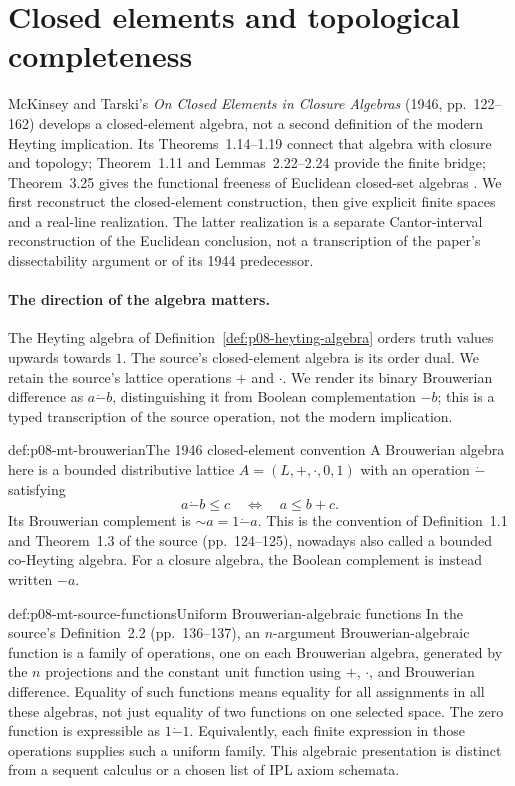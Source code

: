 \section{Closed elements and topological completeness}
\label{sec:p08-mt-topological-completeness}

McKinsey and Tarski's \emph{On Closed Elements in Closure Algebras}
(1946, pp.~122--162) develops a closed-element algebra, not a second
definition of the modern Heyting implication. Its Theorems~1.14--1.19
connect that algebra with closure and topology; Theorem~1.11 and
Lemmas~2.22--2.24 provide the finite bridge; Theorem~3.25 gives the
functional freeness of Euclidean closed-set algebras
\cite{McKinseyTarski1946}. We first reconstruct the closed-element
construction, then give explicit finite spaces and a real-line realization.
The latter realization is a separate Cantor-interval reconstruction of the
Euclidean conclusion, not a transcription of the paper's dissectability
argument or of its 1944 predecessor.

\paragraph{The direction of the algebra matters.}
The Heyting algebra of Definition~\ref{def:p08-heyting-algebra} orders truth
values upwards towards \(1\). The source's closed-element algebra is its
order dual. We retain the source's lattice operations \(+\) and \(\cdot\).
We render its binary Brouwerian difference as \(a\mathbin{\dot{-}}b\),
distinguishing it from Boolean complementation \(-b\); this is a typed
transcription of the source operation, not the modern implication.

\begin{hbdefinition}{def:p08-mt-brouwerian}{The 1946 closed-element convention}
A Brouwerian algebra here is a bounded distributive lattice
\(A=(L,+,\cdot,0,1)\) with an operation \(\dot{-}\) satisfying
\[
 a\mathbin{\dot{-}}b\leq c
 \quad\Longleftrightarrow\quad a\leq b+c.
\]
Its Brouwerian complement is \(\mathord{\sim}a=1\mathbin{\dot{-}}a\).
This is the convention of Definition~1.1 and Theorem~1.3 of the source
(pp.~124--125), nowadays also called a bounded co-Heyting algebra.
For a closure algebra, the Boolean complement is instead written \(-a\).
\end{hbdefinition}

\begin{hbdefinition}{def:p08-mt-source-functions}{Uniform Brouwerian-algebraic functions}
In the source's Definition~2.2 (pp.~136--137), an \(n\)-argument
Brouwerian-algebraic function is a family of operations, one on each
Brouwerian algebra, generated by the \(n\) projections and the constant
unit function using \(+\), \(\cdot\), and Brouwerian difference.
Equality of such functions means equality for all assignments in all
these algebras, not just equality of two functions on one selected space.
The zero function is expressible as \(1\mathbin{\dot{-}}1\).
Equivalently, each finite expression in those operations supplies such
a uniform family. This algebraic presentation is distinct from a
sequent calculus or a chosen list of IPL axiom schemata.
\end{hbdefinition}

